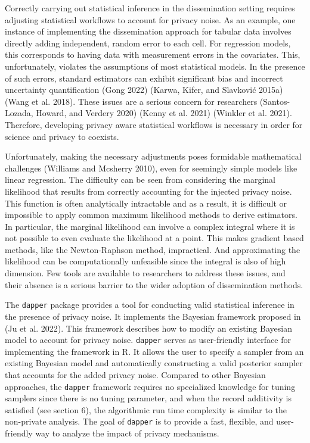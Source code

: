 Correctly carrying out statistical inference in the dissemination setting
requires adjusting statistical workflows to account for privacy noise.
As an example, one instance of implementing the dissemination approach for tabular data involves directly
adding independent, random error to each cell. For regression models,
this corresponds to having data with measurement errors
in the covariates. This, unfortunately, violates the assumptions of most statistical models.
In the presence of such errors, standard estimators can exhibit significant bias and incorrect uncertainty quantification
(Gong 2022) (Karwa, Kifer, and Slavković 2015a) (Wang et al. 2018).
These issues are a serious concern for researchers (Santos-Lozada, Howard, and Verdery 2020) (Kenny et al. 2021) (Winkler et al. 2021).
Therefore, developing privacy aware statistical workflows is necessary in order
for science and privacy to coexists.

Unfortunately, making the necessary adjustments poses formidable mathematical
challenges (Williams and Mcsherry 2010), even for seemingly simple models like linear regression.
The difficulty can be seen from considering the marginal likelihood that results from correctly accounting for the injected
privacy noise. This function is often analytically intractable and as a result,
it is difficult or impossible to apply common maximum likelihood methods
to derive estimators. In particular, the marginal likelihood can involve a complex
integral where it is not possible to even evaluate the likelihood
at a point. This makes gradient based methods, like the Newton-Raphson method,
impractical. And approximating the likelihood can be computationally
unfeasible since the integral is also of high dimension.
Few tools are available to researchers to address these issues,
and their absence is a serious barrier to the wider adoption
of dissemination methods.

The \texttt{dapper} package provides a tool for conducting
valid statistical inference in the presence of privacy noise.
It implements the Bayesian framework proposed in (Ju et al. 2022). This framework describes how to modify
an existing Bayesian model to account for privacy noise. \texttt{dapper}
serves as user-friendly interface for implementing the framework in R. It allows the
user to specify a sampler from an existing Bayesian model and
automatically constructing a valid posterior sampler that accounts for the
added privacy noise. Compared to other Bayesian approaches, the \texttt{dapper} framework requires
no specialized knowledge for tuning samplers since there is no tuning parameter,
and when the record additivity is satisfied (see section 6), the algorithmic run time
complexity is similar to the non-private analysis. The goal of \texttt{dapper} is to provide
a fast, flexible, and user-friendly way to analyze the impact of privacy mechanisms.

